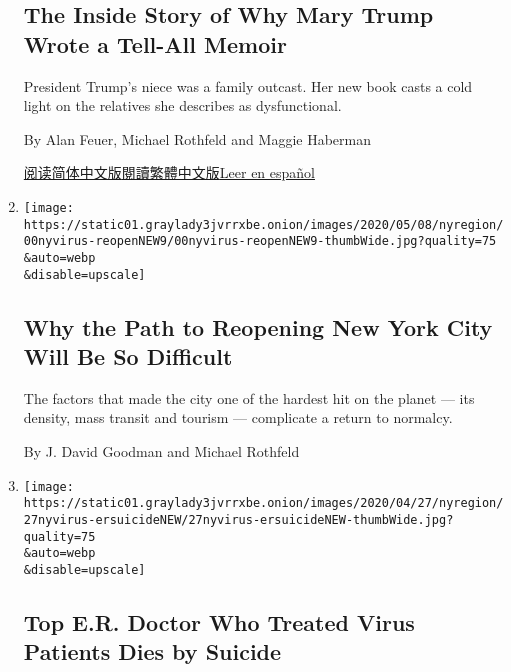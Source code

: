 \begin{enumerate}
{  \subsection{The Inside Story of Why Mary Trump Wrote a Tell-All
  Memoir}\label{the-inside-story-of-why-mary-trump-wrote-a-tell-all-memoir}}

  President Trump's niece was a family outcast. Her new book casts a
  cold light on the relatives she describes as dysfunctional.

  By Alan Feuer, Michael Rothfeld and Maggie Haberman

  \href{https://cn.nytimes3xbfgragh.onion/usa/20200709/mary-trump-book/}{阅读简体中文版}\href{https://cn.nytimes3xbfgragh.onion/usa/20200709/mary-trump-book/zh-hant/}{閱讀繁體中文版}\href{https://www.nytimes3xbfgragh.onion/es/2020/07/09/espanol/mundo/libro-mary-trump-sobrina.html}{Leer
  en español}
\item
  \href{/2020/05/10/nyregion/reopen-coronavirus-nyc-testing.html}{}

  \texttt{[image: https://static01.graylady3jvrrxbe.onion/images/2020/05/08/nyregion/00nyvirus-reopenNEW9/00nyvirus-reopenNEW9-thumbWide.jpg?quality=75\\\&auto=webp\\\&disable=upscale]}

  \hypertarget{why-the-path-to-reopening-new-york-city-will-be-so-difficult}{%
  \subsection{Why the Path to Reopening New York City Will Be So
  Difficult}\label{why-the-path-to-reopening-new-york-city-will-be-so-difficult}}

  The factors that made the city one of the hardest hit on the planet
  --- its density, mass transit and tourism --- complicate a return to
  normalcy.

  By J. David Goodman and Michael Rothfeld
\item
  \href{/2020/04/27/nyregion/new-york-city-doctor-suicide-coronavirus.html}{}

  \texttt{[image: https://static01.graylady3jvrrxbe.onion/images/2020/04/27/nyregion/27nyvirus-ersuicideNEW/27nyvirus-ersuicideNEW-thumbWide.jpg?quality=75\\\&auto=webp\\\&disable=upscale]}

  \hypertarget{top-er-doctor-who-treated-virus-patients-dies-by-suicide}{%
  \subsection{Top E.R. Doctor Who Treated Virus Patients Dies by
  Suicide}\label{top-er-doctor-who-treated-virus-patients-dies-by-suicide}}


\end{enumerate}
